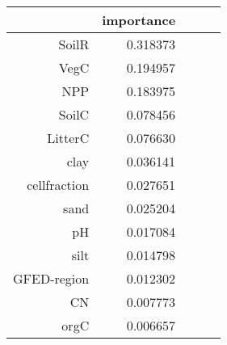 \begin{tabular}{rrrrr}
\toprule
 & importance \\
\midrule
SoilR & 0.318373 \\
VegC & 0.194957 \\
NPP & 0.183975 \\
SoilC & 0.078456 \\
LitterC & 0.076630 \\
clay & 0.036141 \\
cellfraction & 0.027651 \\
sand & 0.025204 \\
pH & 0.017084 \\
silt & 0.014798 \\
GFED-region & 0.012302 \\
CN & 0.007773 \\
orgC & 0.006657 \\
\bottomrule
\end{tabular}
